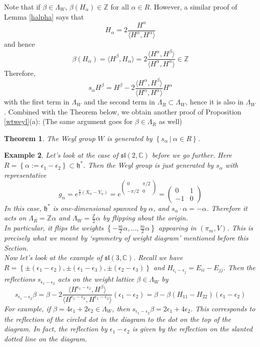 \documentclass[11pt]{book}
\newtheorem{theorem}{Theorem}[section]
\newtheorem{example}[theorem]{Example}
\newcommand{\bb}[1]{\mathbb{#1}}
\newcommand{\mf}[1]{\mathfrak{#1}}
\begin{document}
\noindent Note that if $\beta \in \Lambda_W$, $\beta(H_{\alpha}) \in \bb{Z}$ for all $\alpha \in R$. However, a similar proof of Lemma \ref{halpha} says that
$$H_{\alpha} = 2\frac{H^{\alpha}}{ \langle H^{\alpha}, H^{\alpha} \rangle}$$
and hence
$$\beta(H_{\alpha}) = \langle H^{\beta}, H_{\alpha} \rangle = 2\frac{\langle H^{\alpha}, H^{\beta} \rangle}{ \langle H^{\alpha}, H^{\alpha} \rangle} \in \bb{Z}$$
Therefore,
$$s_{\alpha}H^{\beta} = H^{\beta} - 2\frac{\langle H^{\alpha}, H^{\beta} \rangle}{ \langle H^{\alpha}, H^{\alpha} \rangle} H^{\alpha}$$
with the first term in $\Lambda_W$ and the second term in $\Lambda_R \subset \Lambda_W$, hence it is also in $\Lambda_W$. Combined with the Theorem below, we obtain another proof of Proposition \ref{wtweyl}(a): (The same argument goes for $\beta \in \Lambda_R$ as well)
\begin{theorem}
The Weyl group $W$ is generated by $\left\{ s_{\alpha}\ \Big|\ \alpha \in R\right\}$.
\end{theorem}
\begin{example}
Let's look at the case of $\mf{sl}(2,\bb{C})$ before we go further. Here $R = \left\{ \alpha := \epsilon_1 - \epsilon_2 \right\} \subset \mf{h}^*$. Then the Weyl group is just generated by $s_{\alpha}$ with representative
$$g_{\alpha} = e^{\frac{\pi}{2}(X_{\alpha} - Y_{\alpha})} = e^{\left( \begin{array}{cc}
 0 & \pi/2\\
-\pi/2 & 0 \end{array} \right)} = \left( \begin{array}{cc}
 0 & 1\\
-1 & 0 \end{array} \right)$$
In this case, $\mf{h}^*$ is one-dimensional spanned by $\alpha$, and $s_{\alpha}\cdot \alpha = -\alpha$. Therefore it acts on $\Lambda_R = \bb{Z}\alpha$ and $\Lambda_W = \frac{\bb{Z}}{2}\alpha$ by flipping about the origin.\\
In particular, it flips the weights $\left\{-\frac{m}{2}\alpha,\dots,\frac{m}{2}\alpha\right\}$ appearing in $(\pi_m,V)$. This is precisely what we meant by `symmetry of weight diagram' mentioned before this Section.\\

\noindent Now let's look at the example of $\mf{sl}(3,\bb{C})$. Recall we have $R = \left\{\pm(\epsilon_1 - \epsilon_2), \pm(\epsilon_1 - \epsilon_3), \pm(\epsilon_2 - \epsilon_3)\right\}$ and $H_{\epsilon_i - \epsilon_j} = E_{ii} - E_{jj}$. Then the reflections $s_{\epsilon_1 - \epsilon_2}$ acts on the weight lattice $\beta \in \Lambda_W$ by
$$s_{\epsilon_1 - \epsilon_2} \beta = \beta - 2\frac{\langle H^{\epsilon_1 - \epsilon_2}, H^{\beta} \rangle}{\langle H^{\epsilon_1 - \epsilon_2}, H^{\epsilon_1 - \epsilon_2} \rangle} (\epsilon_1 - \epsilon_2) = \beta - \beta(H_{11} - H_{22})(\epsilon_1 - \epsilon_2)$$
For example, if $\beta = 4\epsilon_1 + 2\epsilon_2 \in \Lambda_W$, then $s_{\epsilon_1 - \epsilon_2} \beta = 2\epsilon_1 + 4\epsilon_2$. This corresponds to the reflection of the circled dot in the diagram to the dot on the top of the diagram. In fact, the reflection by $\epsilon_1 - \epsilon_2$ is given by the reflection on the slanted dotted line on the diagram.
\end{example}
\end{document}
